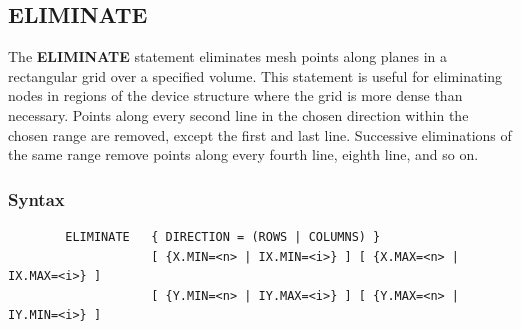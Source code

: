 \documentclass[11pt,pdftex]{article}
\begin{document}
\newpage
\subsection{ELIMINATE}
The \textbf{ELIMINATE} statement eliminates mesh points along planes
in a rectangular grid over a specified volume. This statement is
useful for eliminating nodes in regions of the device structure
where the grid is more dense than necessary. Points along every
second line in the chosen direction within the chosen range are
removed, except the first and last line. Successive eliminations of
the same range remove points along every fourth line, eighth line,
and so on.

\subsubsection*{Syntax}
\begin{verbatim}
        ELIMINATE   { DIRECTION = (ROWS | COLUMNS) }
                    [ {X.MIN=<n> | IX.MIN=<i>} ] [ {X.MAX=<n> | IX.MAX=<i>} ]
                    [ {Y.MIN=<n> | IY.MAX=<i>} ] [ {Y.MAX=<n> | IY.MIN=<i>} ]
\end{verbatim}
\end{document}
